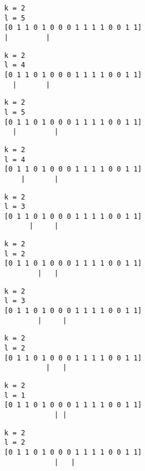 { \begin{verbatim}
        k = 2
        l = 5
        [0 1 1 0 1 0 0 0 1 1 1 1 0 0 1 1]
        |         |
\end{verbatim} }

{ \begin{verbatim}
        k = 2
        l = 4
        [0 1 1 0 1 0 0 0 1 1 1 1 0 0 1 1]
          |       |
\end{verbatim} }

{ \begin{verbatim}
        k = 2
        l = 5
        [0 1 1 0 1 0 0 0 1 1 1 1 0 0 1 1]
          |         |
\end{verbatim} }

{ \begin{verbatim}
        k = 2
        l = 4
        [0 1 1 0 1 0 0 0 1 1 1 1 0 0 1 1]
            |       |
\end{verbatim} }

{ \begin{verbatim}
        k = 2
        l = 3
        [0 1 1 0 1 0 0 0 1 1 1 1 0 0 1 1]
              |     |
\end{verbatim} }

{ \begin{verbatim}
        k = 2
        l = 2
        [0 1 1 0 1 0 0 0 1 1 1 1 0 0 1 1]
                |   |
\end{verbatim} }

{ \begin{verbatim}
        k = 2
        l = 3
        [0 1 1 0 1 0 0 0 1 1 1 1 0 0 1 1]
                |     |
\end{verbatim} }

{ \begin{verbatim}
        k = 2
        l = 2
        [0 1 1 0 1 0 0 0 1 1 1 1 0 0 1 1]
                  |   |
\end{verbatim} }

{ \begin{verbatim}
        k = 2
        l = 1
        [0 1 1 0 1 0 0 0 1 1 1 1 0 0 1 1]
                    | |
\end{verbatim} }

{ \begin{verbatim}
        k = 2
        l = 2
        [0 1 1 0 1 0 0 0 1 1 1 1 0 0 1 1]
                    |   |
\end{verbatim} }

